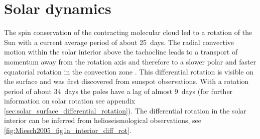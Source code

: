 \section{Solar dynamics}
\label{sec:solar_dynamics}
The spin conservation of the contracting molecular cloud led to a rotation of the Sun with a current average period of about 25~days. The radial convective motion within the solar interior above the tachocline leads to a transport of momentum away from the rotation axis and therefore to a slower polar and faster equatorial rotation in the convection zone \citep{Miesch2005}. This differential rotation is visible on the surface and was first discovered from sunspot observations. %
With a rotation period of about 34~days the poles have a lag of almost 9~days (for further information on solar rotation see appendix \autoref{sec:solar_surface_differential_rotation}). The differential rotation in the solar interior can be inferred from helioseismological observations, see \autoref{fig:Miesch2005_fig1a_interior_diff_rot}.
